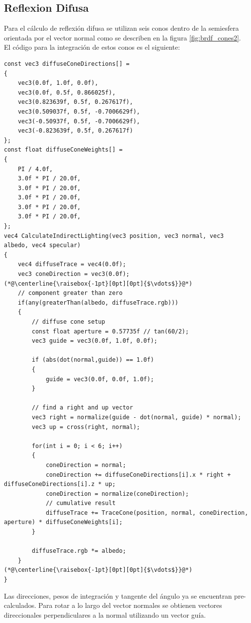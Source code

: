 \subsection{Reflexion Difusa} %
\label{sub:reflexion_difuse}
Para el cálculo de reflexión difusa se utilizan seis conos dentro de la semiesfera orientada por el vector normal como se describen en la figura \ref{fig:brdf_cones2}. El código para la integración de estos conos es el siguiente:
\\
\begin{lstlisting}[caption={Conos para reflexion difusa.}, label=Trace3]
const vec3 diffuseConeDirections[] =
{
    vec3(0.0f, 1.0f, 0.0f),
    vec3(0.0f, 0.5f, 0.866025f),
    vec3(0.823639f, 0.5f, 0.267617f),
    vec3(0.509037f, 0.5f, -0.7006629f),
    vec3(-0.50937f, 0.5f, -0.7006629f),
    vec3(-0.823639f, 0.5f, 0.267617f)
};
const float diffuseConeWeights[] =
{
    PI / 4.0f,
    3.0f * PI / 20.0f,
    3.0f * PI / 20.0f,
    3.0f * PI / 20.0f,
    3.0f * PI / 20.0f,
    3.0f * PI / 20.0f,
};
vec4 CalculateIndirectLighting(vec3 position, vec3 normal, vec3 albedo, vec4 specular)
{
    vec4 diffuseTrace = vec4(0.0f);
    vec3 coneDirection = vec3(0.0f);
(*@\centerline{\raisebox{-1pt}[0pt][0pt]{$\vdots$}}@*)
    // component greater than zero
    if(any(greaterThan(albedo, diffuseTrace.rgb)))
    {
        // diffuse cone setup
        const float aperture = 0.57735f // tan(60/2);
        vec3 guide = vec3(0.0f, 1.0f, 0.0f);

        if (abs(dot(normal,guide)) == 1.0f)
        {
            guide = vec3(0.0f, 0.0f, 1.0f);
        }

        // find a right and up vector
        vec3 right = normalize(guide - dot(normal, guide) * normal);
        vec3 up = cross(right, normal);

        for(int i = 0; i < 6; i++)
        {
            coneDirection = normal;
            coneDirection += diffuseConeDirections[i].x * right + diffuseConeDirections[i].z * up;
            coneDirection = normalize(coneDirection);
            // cumulative result
            diffuseTrace += TraceCone(position, normal, coneDirection, aperture) * diffuseConeWeights[i];
        }

        diffuseTrace.rgb *= albedo;
    }
(*@\centerline{\raisebox{-1pt}[0pt][0pt]{$\vdots$}}@*)
}
\end{lstlisting}
Las direcciones, pesos de integración y tangente del ángulo ya se encuentran pre-calculados. Para rotar a lo largo del vector normales se obtienen vectores direccionales perpendiculares a la normal utilizando un vector guía.
